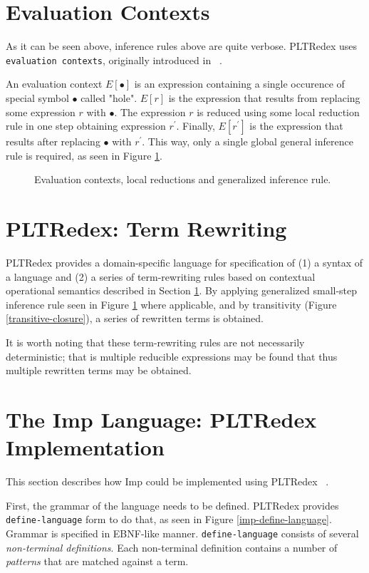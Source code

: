 \section{Evaluation Contexts}
\label{02-evaluation-context}
As it can be seen above, inference rules above are quite verbose. PLTRedex uses \texttt{evaluation contexts}, originally introduced in ~\cite{felleisen1992revised}.

An evaluation context $E[\bullet]$ is an expression containing a single occurence of special symbol $\bullet$ called "hole". $E[r]$ is the expression that results from replacing some expression $r$ with $\bullet$. The expression $r$ is reduced using some local reduction rule in one step obtaining expression $r^\prime$. Finally, $E[r^\prime]$ is the expression that results after replacing $\bullet$ with $r^\prime$. This way, only a single global general inference rule is required, as seen in Figure \ref{infer-evaluation}. 

\begin{figure}[htb]

\caption{Evaluation contexts, local reductions and generalized inference rule.}
\label{infer-evaluation}
\end{figure}

\section{PLTRedex: Term Rewriting}
PLTRedex provides a domain-specific language for specification of (1) a syntax of a language and (2) a series of term-rewriting rules based on contextual operational semantics described in Section \ref{02-evaluation-context}. By applying generalized small-step inference rule seen in Figure \ref{infer-evaluation} where applicable, and by transitivity (Figure \ref{transitive-closure}), a series of rewritten terms is obtained.

It is worth noting that these term-rewriting rules are not necessarily deterministic; that is multiple reducible expressions may be found that thus multiple rewritten terms may be obtained.

\section{The Imp Language: PLTRedex Implementation}
\label{02-pltredex}
This section describes how Imp could be implemented using PLTRedex ~\cite{redexreference}. 

First, the grammar of the language needs to be defined. PLTRedex provides \texttt{define-language} form to do that, as seen in Figure \ref{imp-define-language}. Grammar is specified in EBNF-like manner. \texttt{define-language} consists of several \textit{non-terminal definitions}. Each non-terminal definition contains a number of \textit{patterns} that are matched against a term. 

